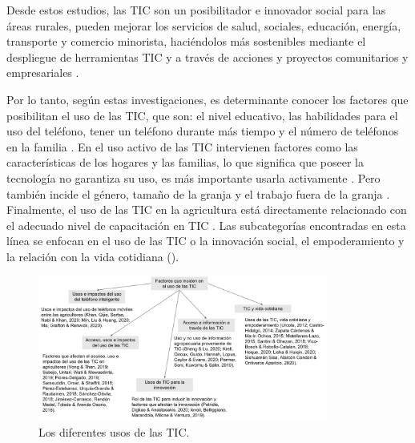 \documentclass[spanish]{textolivre}
\begin{document}
Desde estos estudios, las TIC son un posibilitador e innovador social para las áreas rurales, pueden mejorar los servicios de salud, sociales, educación, energía, transporte y comercio minorista, haciéndolos más sostenibles mediante el despliegue de herramientas TIC y a través de acciones y proyectos comunitarios y empresariales \cite{ievoli_information_2019}. 

Por lo tanto, según estas investigaciones, es determinante conocer los factores que posibilitan el uso de las TIC, que son: el nivel educativo, las habilidades para el uso del teléfono, tener un teléfono durante más tiempo y el número de teléfonos en la familia \cite{khan_farmers_2020}. En el uso activo de las TIC intervienen factores como las características de los hogares y las familias, lo que significa que poseer la tecnología no garantiza su uso, es más importante usarla activamente \cite{sheng_influence_2020}. Pero también incide el género, tamaño de la granja y el trabajo fuera de la granja \cite{ma_smartphone_2020}. Finalmente, el uso de las TIC en la agricultura está directamente relacionado con el adecuado nivel de capacitación en TIC \cite{perez-estebanez_technological_2018}. Las subcategorías encontradas en esta línea se enfocan en el uso de las TIC o la innovación social, el empoderamiento y la relación con la vida cotidiana (). 

\begin{figure}[htbp]
\centering
\includegraphics[width=0.85\textwidth]{fig3.png}
\caption{Los diferentes usos de las TIC.}
\label{fig3}
\end{figure}
\end{document}
